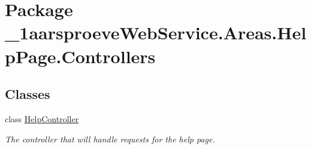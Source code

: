 \hypertarget{namespace__1aarsproeve_web_service_1_1_areas_1_1_help_page_1_1_controllers}{}\section{Package \+\_\+1aarsproeve\+Web\+Service.\+Areas.\+Help\+Page.\+Controllers}
\label{namespace__1aarsproeve_web_service_1_1_areas_1_1_help_page_1_1_controllers}
\subsection*{Classes}
\begin{DoxyCompactItemize}
\item 
class \hyperlink{class__1aarsproeve_web_service_1_1_areas_1_1_help_page_1_1_controllers_1_1_help_controller}{Help\+Controller}
\begin{DoxyCompactList}\small\item\em The controller that will handle requests for the help page. \end{DoxyCompactList}\end{DoxyCompactItemize}
